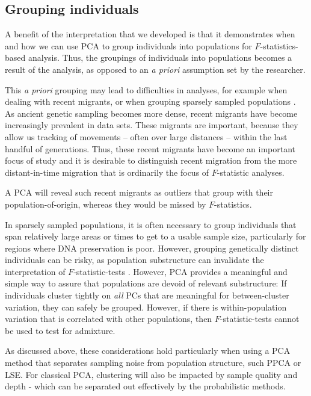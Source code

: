 \documentclass[12pt, letterpaper]{article}
\begin{document}
\subsection{Grouping individuals}
A benefit of the interpretation that we developed is that it demonstrates when and how we can use PCA to group individuals into populations for $F$-statistics-based analysis. 
Thus, the groupings of individuals into populations becomes a result of the analysis, as opposed to an \textit{a priori} assumption set by the researcher.

This \textit{a priori} grouping may lead to difficulties in analyses, for example when dealing with recent migrants, or when grouping sparsely sampled populations \cite{shringarpure_effects_2014}. As ancient genetic sampling becomes more dense, recent migrants have become increasingly prevalent in data sets. These migrants are important, because they allow us tracking of movements -- often over large distances -- within the last handful of generations. Thus, these recent migrants have become an important focus of study and it is desirable to distinguish recent migration from the more distant-in-time migration that is ordinarily the focus of $F$-statistic analyses.

A PCA will reveal such recent migrants as outliers that group with their population-of-origin, whereas they would be missed by $F$-statistics.

In sparsely sampled populations, it is often necessary to group individuals that span relatively large areas or times to get to a usable sample size, particularly for regions where DNA preservation is poor. However, grouping genetically distinct individuals can be risky, as population substructure can invalidate the interpretation of $F$-statistic-tests \cite{peter_admixture_2016}. However, PCA provides a meaningful and simple way to assure that populations are devoid of relevant substructure: If individuals  cluster tightly on \emph{all} PCs that are meaningful for between-cluster variation, they can safely be grouped. However, if there is within-population variation that is correlated with other populations, then $F$-statistic-tests cannot be used to test for admixture. 

As discussed above, these considerations hold particularly when using a PCA method that separates sampling noise from population structure, such PPCA or LSE. For classical PCA, clustering will also be impacted by sample quality and depth - which can be separated out effectively by the probabilistic methods.
\end{document}

